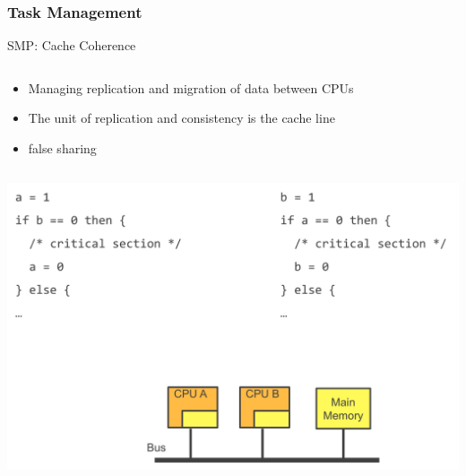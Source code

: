 \begin{frame}
\frametitle{Task Management}
\begin{block}{SMP: Cache Coherence}
\begin{column}{.5\textwidth}

\begin{itemize}
	\item Managing replication and migration of data between CPUs
	\item The unit of replication and consistency is the cache line
	\item false sharing 
\end{itemize} 

\end{column}
\begin{column}{.5\textwidth}
\includegraphics[width=\textwidth]{fig23/smp2.jpg}
\end{column}

\end{block}
\end{frame}







